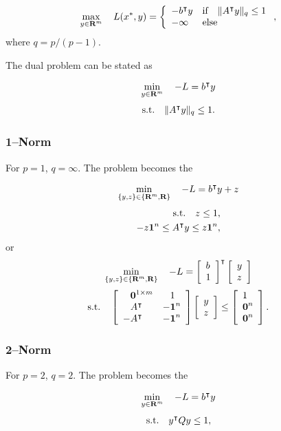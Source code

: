 \documentclass{article}
\begin{document}
\begin{align*}
    \max_{y\in\textbf{R}^m}\quad L(x^*,y) = 
    \left\{ 
    \begin{array}{lllllllllllllllllll}
        -b^\intercal y & \text{if}\quad \|A^\intercal y\|_q\leq 1\\
        -\infty & \text{else}
    \end{array}    
    \right.,
\end{align*}
where $q=p/(p-1)$.


The dual problem can be stated as

\begin{align}
    \min_{y\in\textbf{R}^m}\quad -L = b^\intercal y
\end{align}
\begin{align*}
    \text{s.t.}\quad \|A^\intercal y\|_q \leq 1.
\end{align*}

\subsubsection{1--Norm}

For $p=1$, $q=\infty$. The problem becomes the \LP

\begin{align*}
    \min_{\{y,z\}\in\{\textbf{R}^m,\textbf{R}\}}\quad -L = b^\intercal y + z
\end{align*}
\begin{align*}
    \text{s.t.}\quad z \leq 1,\\
    -z\textbf{1}^n \leq A^\intercal y \leq z\textbf{1}^n,
\end{align*}
or
\begin{align*}
    \min_{\{y,z\}\in\{\textbf{R}^m,\textbf{R}\}}\quad -L =\left[\begin{array}{lllllllllllllllllll}b\\1\end{array}\right]^\intercal \left[\begin{array}{lllllllllllllllllll}y \\ z\end{array}\right]
\end{align*}
\begin{align*}
    \st\quad 
    \mat{\minus\zeros^{1\times m} & \minus1\\ \minus A^\tp & -\ones^n \\ -A^\tp & -\ones^n }\mat{y\\z}\leq\mat{1\\\zeros^n\\\zeros^n}.
\end{align*}
\subsubsection{2--Norm}

For $p=2$, $q=2$. The problem becomes the \QCQP

\begin{align*}
    \min_{y\in\textbf{R}^m}\quad -L =b^\intercal y
\end{align*}
\begin{align*}
    \text{s.t.}\quad y^\intercal Q y \leq 1,
\end{align*}
\end{document}

